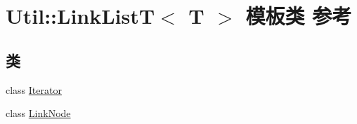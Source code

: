 \hypertarget{class_util_1_1_link_list_t}{\section{Util\-:\-:Link\-List\-T$<$ T $>$ 模板类 参考}
\label{class_util_1_1_link_list_t}
}
\subsection*{类}
\begin{DoxyCompactItemize}
\item 
class \hyperlink{class_util_1_1_link_list_t_1_1_iterator}{Iterator}
\item 
class \hyperlink{class_util_1_1_link_list_t_1_1_link_node}{Link\-Node}
\end{DoxyCompactItemize}
